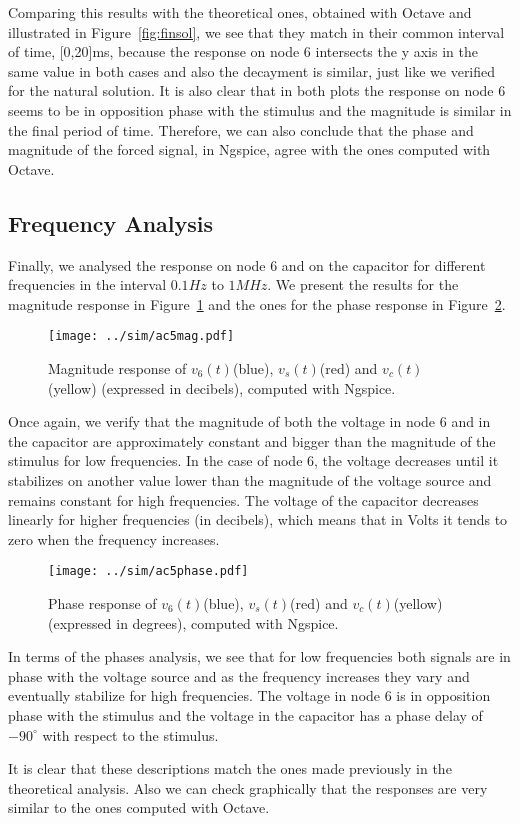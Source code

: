 Comparing this results with the theoretical ones, obtained with Octave and illustrated in Figure~\ref{fig:finsol}, we see that they match in their common interval of time, [0,20]ms, because the response on node 6 intersects the y axis in the same value in both cases and also the decayment is similar, just like we verified for the natural solution. It is also clear that in both plots the response on node 6 seems to be in opposition phase with the stimulus and the magnitude is similar in the final period of time. Therefore, we can also conclude that the phase and magnitude of the forced signal, in Ngspice, agree with the ones computed with Octave.

\subsection{Frequency Analysis} \label{subsec:freqanalysis}

Finally, we analysed the response on node 6 and on the capacitor for different frequencies in the interval $0.1Hz$ to $1MHz$. We present the results for the magnitude response in Figure~\ref{fig:simmag} and the ones for the phase response in Figure~\ref{fig:simphase}.

\begin{figure}[H] \centering
\texttt{[image: ../sim/ac5mag.pdf]}
\caption{Magnitude response of $v_6(t)$(blue), $v_s(t)$(red) and $v_c(t)$(yellow) (expressed in decibels), computed with Ngspice.}
\label{fig:simmag}
\end{figure}

Once again, we verify that the magnitude of both the voltage in node 6 and in the capacitor are approximately constant and bigger than the magnitude of the stimulus for low frequencies. In the case of node 6, the voltage decreases until it stabilizes on another value lower than the magnitude of the voltage source and remains constant for high frequencies. The voltage of the capacitor decreases linearly for higher frequencies (in decibels), which means that in Volts it tends to zero when the frequency increases.

\begin{figure}[H] \centering
\texttt{[image: ../sim/ac5phase.pdf]}
\caption{Phase response of $v_6(t)$(blue), $v_s(t)$(red) and $v_c(t)$(yellow) (expressed in degrees), computed with Ngspice.}
\label{fig:simphase}
\end{figure}

In terms of the phases analysis, we see that for low frequencies both signals are in phase with the voltage source and as the frequency increases they vary and eventually stabilize for high frequencies. The voltage in node 6 is in opposition phase with the stimulus and the voltage in the capacitor has a phase delay of $-90^{\circ}$ with respect to the stimulus.

It is clear that these descriptions match the ones made previously in the theoretical analysis. Also we can check graphically that the responses are very similar to the ones computed with Octave.



